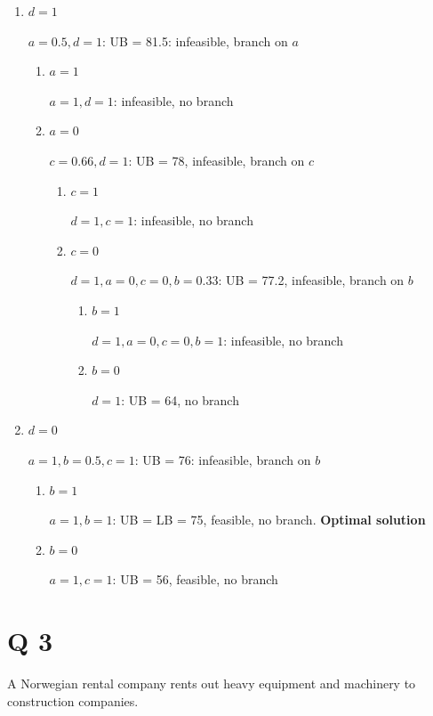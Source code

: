 \documentclass[10pt]{article}
\begin{document}
\begin{enumerate}
    \item $d = 1 $

    $a = 0.5, d = 1 $: UB = 81.5: infeasible, branch on $a $
    \begin{enumerate}
        \item $a = 1 $

        $a = 1, d = 1 $: infeasible, no branch 
        \item $a = 0 $

        $c = 0.66, d = 1 $: UB = 78, infeasible, branch on $c $
        \begin{enumerate}
            \item $c = 1 $

            $d = 1, c = 1 $: infeasible, no branch 
            \item $c = 0 $

            $d = 1, a = 0, c = 0, b = 0.33 $: UB = 77.2, infeasible, branch on $b $
            \begin{enumerate}
                \item $b = 1 $

                $d = 1, a = 0, c = 0, b = 1 $: infeasible, no branch 
                \item $b = 0 $

                $d = 1 $: UB = 64, no branch 
            \end{enumerate}
        \end{enumerate}
    \end{enumerate}
    \item $d = 0 $

    $a = 1, b = 0.5, c = 1 $: UB = 76: infeasible, branch on $b $
    \begin{enumerate}
        \item $b = 1 $

        $a = 1, b = 1 $: UB = LB = 75, feasible, no branch. \textbf{Optimal solution}
        \item $b = 0 $

        $a = 1, c = 1 $: UB = 56, feasible, no branch 
    \end{enumerate}
\end{enumerate}

\newpage
\section{Q 3}
A Norwegian rental company rents out heavy equipment and machinery to construction companies.
\end{document}
